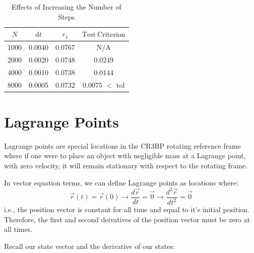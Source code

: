 \documentclass{article}
\newcommand{\cw}{\color{white}}
\newcommand{\deriv}[2]{\frac{d#1}{d#2}}
\begin{document}
\begin{table}[h]
    \centering
    \caption{\cw Effects of Increasing the Number of Steps}
    \begin{tabular}{cccc} \toprule
        {$N$} & {$\mathrm{d}t$} & {$r_1$} & {$\mathrm{Test \ Criterion}$}      \\ \midrule
        1000  & 0.0040          & 0.0767  & N/A                                \\
        2000  & 0.0020          & 0.0748  & 0.0249                             \\
        4000  & 0.0010          & 0.0738  & 0.0144                             \\
        8000  & 0.0005          & 0.0732  & \color{magenta} 0.0075 \cw $<$ tol \\ \bottomrule
    \end{tabular}
    \label{tab:table2}
\end{table}

\pagebreak


\section{Lagrange Points}

Lagrange points are special locations in the CR3BP rotating reference frame where if one were to place an object with negligible mass at a Lagrange point, with zero velocity, it will remain stationary with respect to the rotating frame.

\vspace{\baselineskip}

In vector equation terms, we can define Lagrange points as locations where:
\begin{equation*}
    \vec{r}(t) = \vec{r}(0) \rightarrow \deriv{\vec{r}}{t} = \vec{0} \rightarrow \deriv{^2\vec{r}}{t^2} = \vec{0}
\end{equation*}
i.e., the position vector is constant for all time and equal to it's initial position. Therefore, the first and second deivatives of the position vector must be zero at all times.

\vspace{\baselineskip}

Recall our state vector and the derivative of our states:
\end{document}
